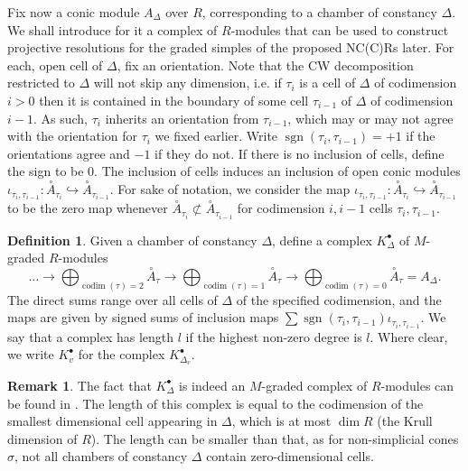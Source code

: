 \documentclass[reqno, 12pt]{amsart}
\theoremstyle{definition}
\newtheorem{definition}[theorem]{Definition}
\newtheorem{remark}[theorem]{Remark}
\numberwithin{equation}{section}
\newcommand{\opA}{\overset{\circ}{A}}
\begin{document}
Fix now a conic module $A_\Delta$ over $R$, corresponding to a chamber of constancy $\Delta$. We shall introduce for it a complex of $R$-modules that can be used to construct projective resolutions for the graded simples of the proposed NC(C)Rs later. For each, open cell of $\Delta$, fix an orientation. Note that the CW decomposition restricted to $\Delta$ will not skip any dimension, i.e. if $\tau_i$ is a cell of $\Delta$ of codimension $i>0$ then it is contained in the boundary of some cell $\tau_{i-1}$ of $\Delta$ of codimension $i-1$. As such, $\tau_i$ inherits an orientation from $\tau_{i-1}$, which may or may not agree with the orientation for $\tau_i$ we fixed earlier. Write $\operatorname{sgn}(\tau_i,\tau_{i-1})=+1$ if the orientations agree and $-1$ if they do not. If there is no inclusion of cells, define the sign to be 0. The inclusion of cells induces an inclusion of open conic modules $\iota_{\tau_i,\tau_{i-1}}:\opA_{\tau_i}\hookrightarrow\opA_{\tau_{i-1}}$. For sake of notation, we consider the map $\iota_{\tau_i,\tau_{i-1}}:\opA_{\tau_i}\hookrightarrow\opA_{\tau_{i-1}}$ to be the zero map whenever $\opA_{\tau_{i}}\not\subset\opA_{\tau_{i-1}}$ for codimension $i, i-1$ cells $\tau_i, \tau_{i-1}$. \begin{definition}
    \label{Def:CplxChamber}
    Given a chamber of constancy $\Delta$, define a complex $K_\Delta^\bullet$ of $M$-graded $R$-modules\[
    \dots\rightarrow \bigoplus_{\operatorname{codim}(\tau)=2}\opA_{\tau}\rightarrow\bigoplus_{\operatorname{codim}(\tau)=1}\opA_\tau\rightarrow\bigoplus_{\operatorname{codim}(\tau)=0}\opA_\tau=A_\Delta.
    \]
    The direct sums range over all cells of $\Delta$ of the specified codimension, and the maps are given by signed sums of inclusion maps $\sum \operatorname{sgn}(\tau_i,\tau_{i-1})\iota_{\tau_i,\tau_{i-1}}$. We say that a complex has length $l$ if the highest non-zero degree is $l$. Where clear, we write $K_v^\bullet$ for the complex $K_{\Delta_v}^\bullet$.
\end{definition}


\begin{remark}
    The fact that $K_\Delta^\bullet$ is indeed an $M$-graded complex of $R$-modules can be found in \cite[Lemma 5.1]{FMS19}. The length of this complex is equal to the codimension of the smallest dimensional cell appearing in $\Delta$, which is at most $\dim R$ (the Krull dimension of $R$). The length can be smaller than that, as for non-simplicial cones $\sigma$, not all chambers of constancy $\Delta$ contain zero-dimensional cells.
\end{remark}
\end{document}
